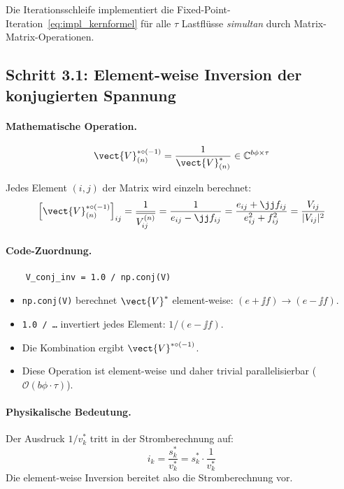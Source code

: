 Die Iterationsschleife implementiert die Fixed-Point-Iteration~\eqref{eq:impl_kernformel} für alle $\tau$ Lastflüsse \textit{simultan} durch Matrix-Matrix-Operationen.

\subsection{Schritt 3.1: Element-weise Inversion der konjugierten Spannung}
\label{subsec:conj_inv}

\paragraph{Mathematische Operation.}
\begin{equation}
	\vect{V}_{(n)}^{*\circ(-1)} = \frac{1}{\vect{V}_{(n)}^*} \in \mathbb{C}^{b\phi \times \tau}
	\label{eq:conj_inv}
\end{equation}

Jedes Element $(i,j)$ der Matrix wird einzeln berechnet:
\begin{equation}
	\left[\vect{V}_{(n)}^{*\circ(-1)}\right]_{ij} = \frac{1}{\overline{V_{ij}^{(n)}}} = \frac{1}{e_{ij} - \jj f_{ij}} = \frac{e_{ij} + \jj f_{ij}}{e_{ij}^2 + f_{ij}^2} = \frac{V_{ij}}{|V_{ij}|^2}
	\label{eq:conj_inv_element}
\end{equation}

\paragraph{Code-Zuordnung.}
\begin{verbatim}
	V_conj_inv = 1.0 / np.conj(V)
\end{verbatim}

\begin{itemize}
	\item \texttt{np.conj(V)} berechnet $\vect{V}^*$ element-weise: $(e + \jj f) \to (e - \jj f)$.
	\item \texttt{1.0 / \ldots} invertiert jedes Element: $1/(e - \jj f)$.
	\item Die Kombination ergibt $\vect{V}^{*\circ(-1)}$.
	\item Diese Operation ist element-weise und daher trivial parallelisierbar ($\mathcal{O}(b\phi \cdot \tau)$).
\end{itemize}

\paragraph{Physikalische Bedeutung.} Der Ausdruck $1/v_k^*$ tritt in der Stromberechnung auf:
\begin{equation}
	i_k = \frac{s_k^*}{v_k^*} = s_k^* \cdot \frac{1}{v_k^*}
	\label{eq:strom_interpretation}
\end{equation}
Die element-weise Inversion bereitet also die Stromberechnung vor.

